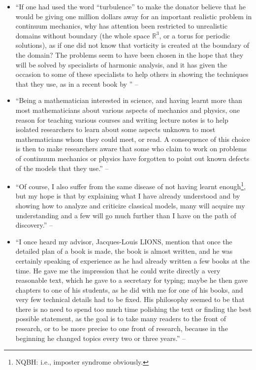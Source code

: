 \documentclass[oneside]{book}
\numberwithin{equation}{section}
\begin{document}
\begin{enumerate}
\begin{itemize}
		\item ``If one had used the word ``turbulence'' to make the donator believe that he would be giving one million dollars away for an important realistic problem in continuum mechanics, why has attention been restricted to unrealistic domains without boundary (the whole space $\mathbb{R}^3$, or a torus for periodic solutions), as if one did not know that vorticity is created at the boundary of the domain? The problems seem to have been chosen in the hope that they will be solved by specialists of harmonic analysis, and it has given the occasion to some of these specialists to help others in showing the techniques that they use, as in a recent book by \cite{Lemarie-Rieusset2016}'' -- \cite[Preface, p. viii]{Tartar2006}		
		\item ``Being a mathematician interested in science, and having learnt more than most mathematicians about various aspects of mechanics and physics, one reason for teaching various courses and writing lecture notes is to help isolated researchers to learn about some aspects unknown to most mathematicians whom they could meet, or read. A consequence of this choice is then to make researchers aware that some who claim to work on problems of continuum mechanics or physics have forgotten to point out known defects of the models that they use.'' -- \cite[Preface, pp. viii--ix]{Tartar2006}
		\item ``Of course, I also suffer from the same disease of not having learnt enough\footnote{NQBH: i.e., imposter syndrome obviously.}, but my hope is that by explaining what I have already understood and by showing how to analyze and criticize classical models, many will acquire my understanding and a few will go much further than I have on the path of discovery.'' -- \cite[Preface, p. ix]{Tartar2006}
		\item ``I once heard my advisor, Jacques-Louis LIONS, mention that once the detailed plan of a book is made, the book is almost written, and he was certainly speaking of experience as he had already written a few books at the time. He gave me the impression that he could write directly a very reasonable text, which he gave to a secretary for typing; maybe he then gave chapters to one of his students, as he did with me for one of his books, and very few technical details had to be fixed. His philosophy seemed to be that there is no need to spend too much time polishing the text or finding the best possible statement, as the goal is to take many readers to the front of research, or to be more precise to one front of research, because in the beginning he changed topics every two or three years.'' -- \cite[Preface, p. ix]{Tartar2006}

\end{itemize}
\end{enumerate}
\end{document}
